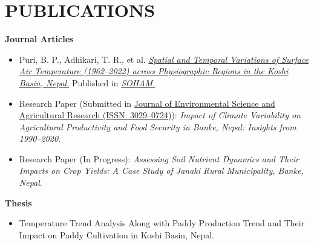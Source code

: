 \documentclass[a4paper, 11pt]{extarticle}
\begin{document}
\section*{PUBLICATIONS}
\noindent
\textbf{Journal Articles}
\begin{itemize}
    \item Puri, B. P., Adhikari, T. R., et al. \href{https://doi.org/10.3126/jhm.v12i1.72654}{\textit{Spatial and Temporal Variations of Surface Air Temperature (1962–2022) across Physiographic Regions in the Koshi Basin, Nepal.}} Published in \href{https://soham.org.np/}{\textit{SOHAM.}}
    \item Research Paper (Submitted in \href{https://oaskpublishers.com/journal-of-environmental-science-and-agricultural-research-jesar-home}{Journal of Environmental Science and Agricultural Research (ISSN: 3029--0724)}): \textit{Impact of Climate Variability on Agricultural Productivity and Food Security in Banke, Nepal: Insights from 1990--2020}.
    \item Research Paper (In Progress): \textit{Assessing Soil Nutrient Dynamics and Their Impacts on Crop Yields: A Case Study of Janaki Rural Municipality, Banke, Nepal}. 
\end{itemize}

\noindent
\textbf{Thesis}
\begin{itemize}
    \item Temperature Trend Analysis Along with Paddy Production Trend and Their Impact on Paddy Cultivation in Koshi Basin, Nepal.

\end{itemize}
\end{document}
